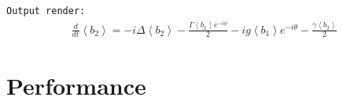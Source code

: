 \documentclass[5p, twocolumn, 10pt, sort&compress]{elsarticle}
\newcommand{\inlinecode}[1]{\texttt{#1}}
\newenvironment{revision2}{%
\color{red}
}
{}
\begin{document}
\begin{revision2}
\noindent\inlinecode{Output render:}
\begin{align*}
\frac{d}{d t} {\left\langle b_{2} \right\rangle} = - i \Delta {\left\langle b_{2} \right\rangle} - \frac{\Gamma {\left\langle b_{1} \right\rangle} e^{- i \phi}}{2} - i g {\left\langle b_{1} \right\rangle} e^{- i \theta} - \frac{\gamma {\left\langle b_{2} \right\rangle}}{2}
\end{align*}
\end{revision2}

\section{Performance}\label{section:performance}
\end{document}

